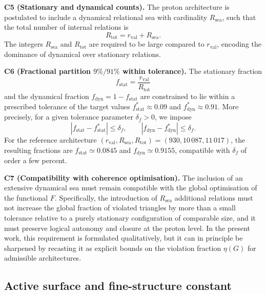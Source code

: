 \documentclass[11pt,a4paper]{article}
\begin{document}
\medskip
\noindent\textbf{C5 (Stationary and dynamical counts).} The proton architecture is postulated to include a dynamical relational sea with cardinality $R_{\mathrm{sea}}$, such that the total number of internal relations is
\begin{equation}
R_{\mathrm{tot}} = r_{\mathrm{val}} + R_{\mathrm{sea}}.
\end{equation}
The integers $R_{\mathrm{sea}}$ and $R_{\mathrm{tot}}$ are required to be large compared to $r_{\mathrm{val}}$, encoding the dominance of dynamical over stationary relations.

\medskip
\noindent\textbf{C6 (Fractional partition $9\%/91\%$ within tolerance).} The stationary fraction
\begin{equation}
f_{\mathrm{stat}} = \frac{r_{\mathrm{val}}}{R_{\mathrm{tot}}}
\end{equation}
and the dynamical fraction $f_{\mathrm{dyn}} = 1 - f_{\mathrm{stat}}$ are constrained to lie within a prescribed tolerance of the target values $f_{\mathrm{stat}}^{\ast}\approx 0.09$ and $f_{\mathrm{dyn}}^{\ast}\approx 0.91$. More precisely, for a given tolerance parameter $\delta_f>0$, we impose
\begin{equation}
|f_{\mathrm{stat}} - f_{\mathrm{stat}}^{\ast}| \leq \delta_f,\qquad |f_{\mathrm{dyn}} - f_{\mathrm{dyn}}^{\ast}| \leq \delta_f.
\end{equation}
For the reference architecture $(r_{\mathrm{val}},R_{\mathrm{sea}},R_{\mathrm{tot}})=(930,10\,087,11\,017)$, the resulting fractions are $f_{\mathrm{stat}}\simeq 0.0845$ and $f_{\mathrm{dyn}}\simeq 0.9155$, compatible with $\delta_f$ of order a few percent.\cite{LaubscherPDLFull2026,LaubscherIMRadPDL2026}

\medskip
\noindent\textbf{C7 (Compatibility with coherence optimisation).} The inclusion of an extensive dynamical sea must remain compatible with the global optimisation of the functional $F$. Specifically, the introduction of $R_{\mathrm{sea}}$ additional relations must not increase the global fraction of violated triangles by more than a small tolerance relative to a purely stationary configuration of comparable size, and it must preserve logical autonomy and closure at the proton level.\cite{LaubscherPDLFull2026,LaubscherLDP2026} In the present work, this requirement is formulated qualitatively, but it can in principle be sharpened by recasting it as explicit bounds on the violation fraction $\eta(G)$ for admissible architectures.

\subsection{Active surface and fine-structure constant}
\end{document}
